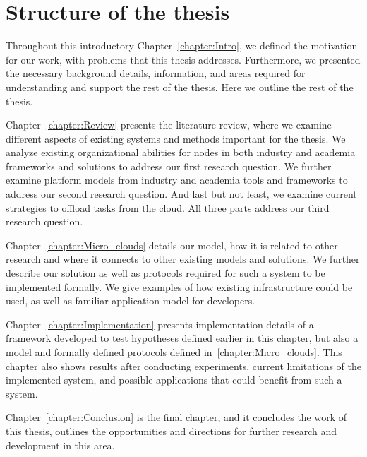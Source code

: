 \section{Structure of the thesis}\label{sec:structure_of_thesis}
%
Throughout this introductory Chapter~\ref{chapter:Intro}, we defined the motivation for our work, with problems that this thesis addresses. Furthermore, we presented the necessary background details, information, and areas required for understanding and support the rest of the thesis. Here we outline the rest of the thesis.

Chapter~\ref{chapter:Review} presents the literature review, where we examine different aspects of existing systems and methods important for the thesis. We analyze existing organizational abilities for nodes in both industry and academia frameworks and solutions to address our first research question. We further examine platform models from industry and academia tools and frameworks to address our second research question. And last but not least, we examine current strategies to offload tasks from the cloud. All three parts address our third research question.

Chapter~\ref{chapter:Micro_clouds} details our model, how it is related to other research and where it connects to other existing models and solutions. We further describe our solution as well as protocols required for such a system to be implemented formally. We give examples of how existing infrastructure could be used, as well as familiar application model for developers. 

Chapter~\ref{chapter:Implementation} presents implementation details of a framework developed to test hypotheses defined earlier in this chapter, but also a model and formally defined protocols defined in~\ref{chapter:Micro_clouds}. This chapter also shows results after conducting experiments, current limitations of the implemented system, and possible applications that could benefit from such a system.

Chapter~\ref{chapter:Conclusion} is the final chapter, and it concludes the work of this thesis, outlines the opportunities and directions for further research and development in this area.
%
%